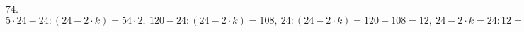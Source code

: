 74. $5\cdot24-24:(24-2\cdot k)=54\cdot2,\ 120-24:(24-2\cdot k)=108,\ 24:(24-2\cdot k)=120-108=12,\ 24-2\cdot k=24:12=2,\ 2\cdot k=24-2=22,\ k=22:2=11.$\\
